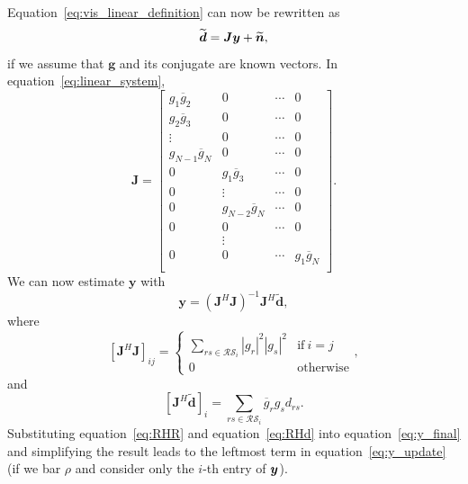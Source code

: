 \documentclass[useAMS,usenatbib]{mn2e}
\newcommand{\bn}{\bmath{n}}
\newcommand{\by}{\bmath{y}}
\newcommand{\conj}[1]{\overline{#1}}
\begin{document}
Equation~\ref{eq:vis_linear_definition} can now be rewritten as 
\begin{equation}
\label{eq:linear_system}
\widetilde{\boldsymbol{d}} = \boldsymbol{J}\boldsymbol{y} + \widetilde{\bn}, 
\end{equation}
if we assume that $\boldsymbol{g}$ and its conjugate are known vectors. In equation~\ref{eq:linear_system},
\begin{equation}
\boldsymbol{J} = 
\begin{bmatrix}
g_1\conj{g}_2 & 0 & \cdots & 0\\
g_2\conj{g}_3 & 0 & \cdots & 0\\
\vdots & 0 & \cdots & 0\\
g_{N-1}\conj{g}_N & 0 & \cdots & 0\\
0 & g_1\conj{g}_3 & \cdots & 0\\
0 & \vdots & \cdots & 0\\
0 & g_{N-2}\conj{g}_N & \cdots & 0\\
0 & 0 & \cdots & 0\\
  & \vdots & \\
0 & 0 & \cdots & g_1\conj{g}_N\\  
\end{bmatrix}.
\end{equation}
We can now estimate $\boldsymbol{y}$ with
\begin{equation}
\label{eq:y_final}
\boldsymbol{y} = (\boldsymbol{J}^H\boldsymbol{J})^{-1}\boldsymbol{J}^H\widetilde{\boldsymbol{d}}, 
\end{equation}
where 
\begin{equation}
\label{eq:RHR}
[\boldsymbol{J}^H\boldsymbol{J}]_{ij} = 
\begin{cases}
\sum_{rs\in\mathcal{RS}_i} |g_r|^2|g_s|^2 &\textrm{if}~i=j\\
0&\textrm{otherwise}
\end{cases},
\end{equation}
and
\begin{equation}
\label{eq:RHd}
[\boldsymbol{J}^H\widetilde{\boldsymbol{d}}]_i = \sum_{rs\in\mathcal{RS}_i} \conj{g}_r g_s d_{rs}. 
\end{equation}
Substituting equation~\ref{eq:RHR} and equation~\ref{eq:RHd} into equation~\ref{eq:y_final} and simplifying the result leads to the leftmost term in equation~\ref{eq:y_update} (if we bar $\rho$ and consider 
only the $i$-th entry of $\by$).
\label{lastpage}
\end{document}
